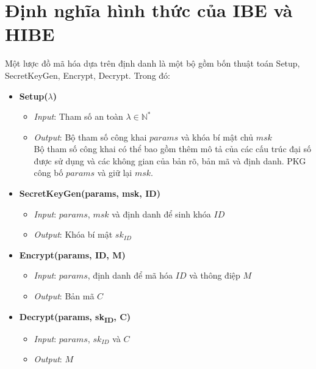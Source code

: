 \documentclass[class=report, crop=false]{standalone}
\begin{document}
	\section{Định nghĩa hình thức của IBE và HIBE}
		\begin{definition}[IBE]
			Một lược đồ mã hóa dựa trên định danh là một bộ gồm bốn thuật toán \textsf{Setup, SecretKeyGen, Encrypt, Decrypt}. Trong đó:
			\vspace{-0.5cm}
			\begin{itemize}
				\item[] {\sffamily\bfseries Setup($\lambda$)}
				\begin{itemize}
					\item[\textbullet] \textit{Input}: Tham số an toàn $\lambda \in \mathbb{N^*}$
					\item[\textbullet] \textit{Output}: Bộ tham số công khai $params$ và khóa bí mật chủ $msk$ \\
					Bộ tham số công khai có thể bao gồm thêm mô tả của các cấu trúc đại số được sử dụng và các không gian của bản rõ, bản mã và định danh. PKG công bố $params$ và giữ lại $msk$.
				\end{itemize}
				\item[] {\sffamily\bfseries SecretKeyGen(params, msk, ID)}
				\begin{itemize}
					\item[\textbullet] \textit{Input}: $params$, $msk$ và định danh để sinh khóa $ID$
					\item[\textbullet] \textit{Output}: Khóa bí mật $sk_{ID}$
				\end{itemize}
				\item[] {\sffamily\bfseries Encrypt(params, ID, M)}
				\begin{itemize}
					\item[\textbullet] \textit{Input}: $params$, định danh để mã hóa $ID$ và thông điệp $M$
					\item[\textbullet] \textit{Output}: Bản mã $C$
				\end{itemize}
				\item[] {\sffamily\bfseries Decrypt(params, sk\textsubscript{ID}, C)}
				\begin{itemize}
					\item[\textbullet] \textit{Input}: $params$, $sk_{ID}$ và $C$
					\item[\textbullet] \textit{Output}: $M$
				\end{itemize}
			\end{itemize}
			\vspace{-\baselineskip}\indent\indent

\end{definition}
\end{document}
